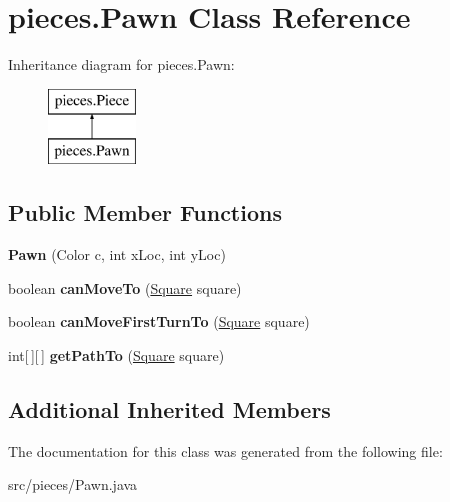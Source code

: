 \hypertarget{classpieces_1_1_pawn}{\section{pieces.\-Pawn Class Reference}
\label{classpieces_1_1_pawn}
}
Inheritance diagram for pieces.\-Pawn\-:\begin{figure}[H]
\begin{center}
\leavevmode
\includegraphics[height=2.000000cm]{classpieces_1_1_pawn}
\end{center}
\end{figure}
\subsection*{Public Member Functions}
\begin{DoxyCompactItemize}
\item 
\hypertarget{classpieces_1_1_pawn_a3b6bf1360b83a9b3e110fbda08aa7ea6}{{\bfseries Pawn} (Color c, int x\-Loc, int y\-Loc)}\label{classpieces_1_1_pawn_a3b6bf1360b83a9b3e110fbda08aa7ea6}

\item 
\hypertarget{classpieces_1_1_pawn_ac970afade564581d65c232f937d39988}{boolean {\bfseries can\-Move\-To} (\hyperlink{classboard_1_1_square}{Square} square)}\label{classpieces_1_1_pawn_ac970afade564581d65c232f937d39988}

\item 
\hypertarget{classpieces_1_1_pawn_a5a65d033ba2d39dd634815d5613a50b8}{boolean {\bfseries can\-Move\-First\-Turn\-To} (\hyperlink{classboard_1_1_square}{Square} square)}\label{classpieces_1_1_pawn_a5a65d033ba2d39dd634815d5613a50b8}

\item 
\hypertarget{classpieces_1_1_pawn_a929000a81247e277fcd03c9f81f4fea2}{int\mbox{[}$\,$\mbox{]}\mbox{[}$\,$\mbox{]} {\bfseries get\-Path\-To} (\hyperlink{classboard_1_1_square}{Square} square)}\label{classpieces_1_1_pawn_a929000a81247e277fcd03c9f81f4fea2}

\end{DoxyCompactItemize}
\subsection*{Additional Inherited Members}


The documentation for this class was generated from the following file\-:\begin{DoxyCompactItemize}
\item 
src/pieces/Pawn.\-java\end{DoxyCompactItemize}
